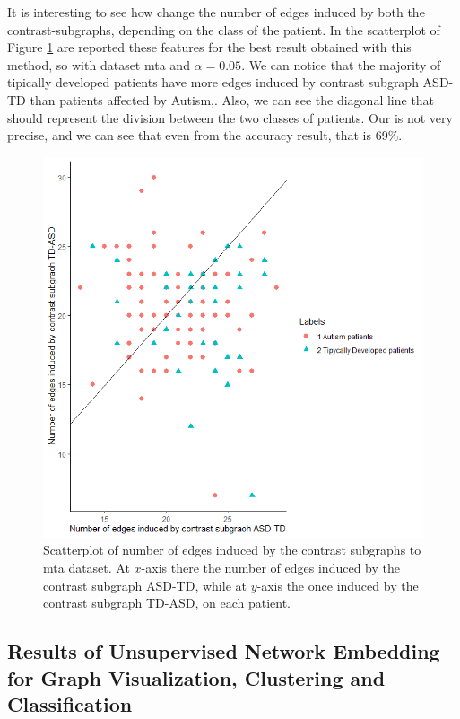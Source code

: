 It is interesting to see how change the number of edges induced by both the contrast-subgraphs, depending on the class of the patient. In the scatterplot of Figure \ref{fig:diagram19} are reported these features for the best result obtained with this method, so with dataset mta and $ \alpha = 0.05 $. We can notice that the majority of tipically developed patients have more edges induced by contrast subgraph ASD-TD than patients affected by Autism,. Also, we can see the diagonal line that should represent the division between the two classes of patients. Our is not very precise, and we can see that even from the accuracy result, that is 69\%.

\begin{figure}[htbp]
	\centering
	\includegraphics[scale=0.5]{Immagini/scatterplot_cs_mta.png}
	\caption{Scatterplot of number of edges induced by the contrast subgraphs to mta dataset. At $x$-axis there the number of edges induced by the contrast subgraph ASD-TD, while at $y$-axis the once induced by the contrast subgraph TD-ASD, on each patient.}
	\label{fig:diagram19}
\end{figure}


\subsection{Results of Unsupervised Network Embedding for Graph Visualization, Clustering and Classification}

